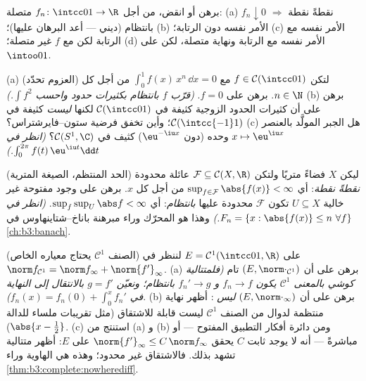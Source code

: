 \begin{exercise}[$\star\star$]\label{exo:b3:complete:8}
برهن أو انقض، من أجل $f_n \colon \intcc01 \to \R$ متصلة:
(a) $f_n \downarrow 0$ نقطةً نقطة $\Rightarrow$ بانتظام (ديني --- أعد
البرهان عليها)؛ (b) الأمر نفسه دون الرتابة؛ (c) الأمر نفسه مع
الرتابة لكن مع $f$ غير متصلة؛ (d) الأمر نفسه مع الرتابة ونهاية
متصلة، لكن على $\intoo01$.
\end{exercise}

\begin{exercise}[$\star\star$]\label{exo:b3:complete:9}
(a) (العزوم تحدّد) لتكن $f \in \mathcal C(\intcc01)$ مع $\int_0^1 f(x)\,x^n\,\dd x = 0$ من أجل كل
$n \in \N$. برهن على $f =
0$. \emph{(قرّب $f$ بانتظام بكثيرات
حدود واحسب $\int f^2$.)}
(b) برهن على أن كثيرات الحدود الزوجية كثيفة في $\mathcal
C(\intcc01)$ لكنها
\emph{ليست} كثيفة في $\mathcal C(\intcc{-1}1)$؛ وأين تخفق فرضية
ستون--فايرشتراس؟
(c) هل الجبر المولَّد بالعنصر $x \mapsto \eu^{\iu x}$ وحده (دون $\eu^{-\iu x}$) كثيف
في $\mathcal C(S^1, \C)$؟ \emph{(انظر في $\int_0^{2\pi}f(t)\,\eu^{\iu t}\dd t$.)}
\end{exercise}

\begin{exercise}[$\star\star\star$]\label{exo:b3:complete:10}
(الحد المنتظم، الصيغة المترية) ليكن $X$ فضاءً متريًا 
ولتكن $\mathcal F \subseteq \mathcal C(X, \R)$ عائلة محدودة \emph{نقطةً نقطة}: أي $\sup_{f \in \mathcal
F}\abs{f(x)} < \infty$ من أجل
كل $x$. برهن على وجود مفتوحة غير خالية $U \subseteq X$ تكون
$\mathcal F$ محدودة عليها \emph{بانتظام}: أي $\sup_{f}\sup_U \abs f < \infty$.
\emph{(انظر في $F_n = \{x : \abs{f(x)} \leq n\ \forall f\}$.)} وهذا هو المحرّك وراء مبرهنة
باناخ--شتاينهاوس في \cref{ch:b3:banach}.
\end{exercise}

\begin{exercise}[$\star\star$]\label{exo:b3:complete:11}
(الصنف $\mathcal C^1$ يحتاج معياره الخاص) على $E = \mathcal
C^1(\intcc01, \R)$ لننظر في
$\norm f_{\mathcal C^1} = \norm
f_\infty + \norm{f'}_\infty$.
(a) برهن على أن $(E, \norm\cdot_{\mathcal C^1})$ تام \emph{(فلمتتالية كوشي بالمعنى
$\mathcal C^1$ يكون $f_n \to f$ و $f_n' \to g$ بانتظام؛ ونعيّن
$g = f'$ بالانتقال إلى النهاية في $f_n(x) = f_n(0) + \int_0^xf_n'$)}.
(b) برهن على أن $(E, \norm\cdot_\infty)$ \emph{ليس} : أظهر نهاية منتظمة
لدوال من الصنف $\mathcal C^1$ ليست قابلة للاشتقاق (مثل تقريبات
ملساء للدالة $\abs{x - \tfrac12}$).
(c) استنتج من (a) و (b) ومن دائرة أفكار التطبيق المفتوح --- أو
مباشرةً --- أنه لا يوجد ثابت $C$ يحقق $\norm{f'}_\infty \leq C\,\norm f_\infty$ على $E$: أظهر
متتالية تشهد بذلك. فالاشتقاق غير محدود؛ وهذه هي الهاوية وراء
\cref{thm:b3:complete:nowherediff}.
\end{exercise}

